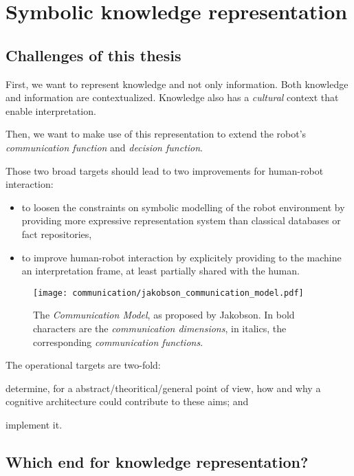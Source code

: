 \chapter{Symbolic knowledge representation}

\section{Challenges of this thesis}
\label{sect|krs-challenges}

First, we want to represent knowledge and not only information.  Both knowledge and information are contextualized. Knowledge also has a \emph{cultural} context that enable interpretation. 

Then, we want to make use of this representation to extend the robot's \emph{communication function} and \emph{decision function}.

Those two broad targets should lead to two improvements for human-robot interaction:
\begin{itemize}
	\item to loosen the constraints on symbolic modelling of the robot environment by providing more expressive representation system than classical databases or fact repositories,
	\item to improve human-robot interaction by explicitely providing to the machine an interpretation frame, at least partially shared with the human.
\end{itemize}

\begin{figure}%
\centering
  \texttt{[image: communication/jakobson\_communication\_model.pdf]}
  \caption{The \emph{Communication Model}, as proposed by Jakobson. In bold characters are the \emph{communication dimensions}, in italics, the corresponding \emph{communication functions}.}
  \label{fig|jakobson_communication_model}
\end{figure}


The operational targets are two-fold:
\begin{inparaenum}
\item determine, for a abstract/theoritical/general point of view, how and why a cognitive architecture could contribute to these aims; and
\item implement it.
\end{inparaenum}

\section{Which end for knowledge representation?}
\label{sect|krs-purpose}

